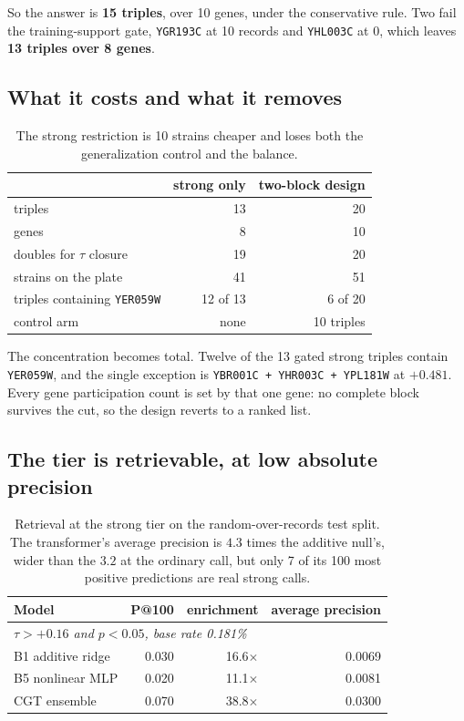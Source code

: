 So the answer is \textbf{15 triples}, over 10 genes, under the conservative rule.
Two fail the training-support gate, \texttt{YGR193C} at 10 records and
\texttt{YHL003C} at 0, which leaves \textbf{13 triples over 8 genes}.

\subsection{What it costs and what it removes}

\begin{table}[H]
\centering
\begin{tabular}{lrr}
\toprule
& strong only & two-block design \\
\midrule
triples                     & 13 & 20 \\
genes                       & 8  & 10 \\
doubles for $\tau$ closure  & 19 & 20 \\
strains on the plate        & 41 & 51 \\
triples containing \texttt{YER059W} & 12 of 13 & 6 of 20 \\
control arm                 & none & 10 triples \\
\bottomrule
\end{tabular}
\caption{The strong restriction is 10 strains cheaper and loses both the
generalization control and the balance.}
\end{table}

The concentration becomes total. Twelve of the 13 gated strong triples contain
\texttt{YER059W}, and the single exception is
\texttt{YBR001C + YHR003C + YPL181W} at $+0.481$. Every gene participation count
is set by that one gene: no complete block survives the cut, so the design
reverts to a ranked list.

\subsection{The tier is retrievable, at low absolute precision}

\begin{table}[H]
\centering
\begin{tabular}{lrrr}
\toprule
Model & P@100 & enrichment & average precision \\
\midrule
\multicolumn{4}{l}{\emph{$\tau > +0.16$ and $p < 0.05$, base rate 0.181\%}} \\
B1 additive ridge & 0.030 & 16.6$\times$ & 0.0069 \\
B5 nonlinear MLP  & 0.020 & 11.1$\times$ & 0.0081 \\
CGT ensemble      & 0.070 & 38.8$\times$ & 0.0300 \\
\bottomrule
\end{tabular}
\caption{Retrieval at the strong tier on the random-over-records test split. The
transformer's average precision is $4.3$ times the additive null's, wider than
the $3.2$ at the ordinary call, but only 7 of its 100 most positive predictions
are real strong calls.}
\end{table}

